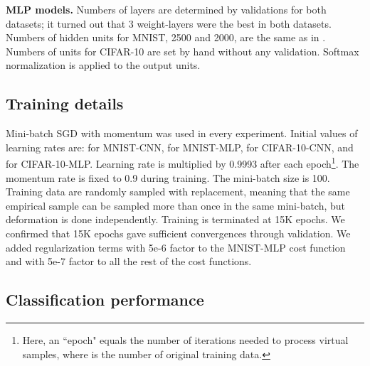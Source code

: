\documentclass[10pt,twocolumn,letterpaper]{article}
\begin{document}
{\bf MLP models.}
Numbers of layers are determined by validations for both
datasets; it turned out that 3 weight-layers were the best in both datasets. 
Numbers of hidden units for MNIST, 2500 and 2000, are the same as in
\cite{Ciresan:2010}.
Numbers of units for CIFAR-10 are set by hand without any validation.
Softmax normalization is applied to the output units.



\subsection{Training details}

Mini-batch SGD with momentum was used in every experiment.
Initial values of learning rates are: 
 for MNIST-CNN,
 for MNIST-MLP,
 for CIFAR-10-CNN, and
 for CIFAR-10-MLP.
Learning rate is multiplied by 0.9993 after each epoch\footnote{Here,
an ``epoch" equals the number of iterations needed to process  virtual samples, where  is the number of 
original training data.}.
The momentum rate is fixed to 0.9 during training.
The mini-batch size is 100.
Training data are randomly sampled with replacement,
meaning that the same empirical sample can be sampled 
more than once in the same mini-batch, 
but deformation is done independently.
Training is terminated at 15K epochs.
We confirmed that 15K epochs gave sufficient convergences through validation.
We added  regularization terms 
with 5e-6 factor to the MNIST-MLP cost function and 
with 5e-7 factor to all the rest of the cost functions.





\subsection{Classification performance}
\end{document}
